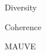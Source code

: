 
\begin{vbframe}{Diversity}
    
\end{vbframe}



\begin{vbframe}{Coherence}
    
\end{vbframe}


\begin{vbframe}{MAUVE}
    
\end{vbframe}


\endlecture
